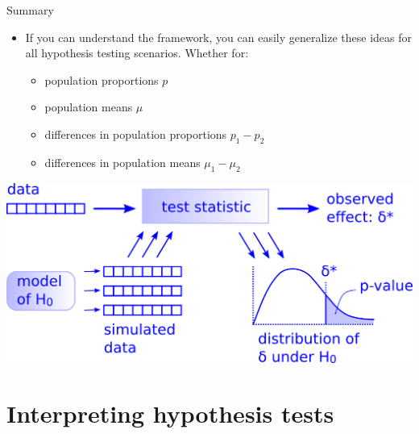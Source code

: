 \documentclass[
  ignorenonframetext,
]{beamer}
\providecommand{\tightlist}{%
  \setlength{\itemsep}{0pt}\setlength{\parskip}{0pt}}
\begin{document}
\begin{frame}{Summary}
\protect\hypertarget{summary}{}
\begin{itemize}
\item
  If you can understand the framework, you can easily generalize these
  ideas for all hypothesis testing scenarios. Whether for:

  \begin{itemize}
  \tightlist
  \item
    population proportions \(p\)
  \item
    population means \(\mu\)
  \item
    differences in population proportions \(p_1-p_2\)
  \item
    differences in population means \(\mu_1-\mu_2\)
  \end{itemize}
\end{itemize}

\begin{center}\includegraphics[width=0.7\linewidth,height=0.5\textheight]{week12_8} \end{center}
\end{frame}

\hypertarget{interpreting-hypothesis-tests}{%
\section{Interpreting hypothesis
tests}\label{interpreting-hypothesis-tests}}
\end{document}
